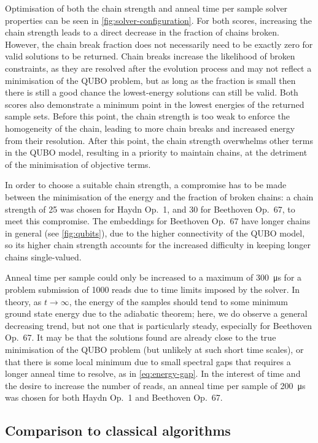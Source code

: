 \documentclass[twocolumn]{article}
\theoremstyle{definition}
\begin{document}
Optimisation of both the chain strength and anneal time per sample solver properties can be seen in \cref{fig:solver-configuration}. For both scores, increasing the chain strength leads to a direct decrease in the fraction of chains broken. However, the chain break fraction does not necessarily need to be exactly zero for valid solutions to be returned. Chain breaks increase the likelihood of broken constraints, as they are resolved after the evolution process and may not reflect a minimisation of the QUBO problem, but as long as the fraction is small then there is still a good chance the lowest-energy solutions can still be valid. Both scores also demonstrate a minimum point in the lowest energies of the returned sample sets. Before this point, the chain strength is too weak to enforce the homogeneity of the chain, leading to more chain breaks and increased energy from their resolution. After this point, the chain strength overwhelms other terms in the QUBO model, resulting in a priority to maintain chains, at the detriment of the minimisation of objective terms.

In order to choose a suitable chain strength, a compromise has to be made between the minimisation of the energy and the fraction of broken chains: a chain strength of \num{25} was chosen for Haydn Op.\ 1, and \num{30} for Beethoven Op.\ 67, to meet this compromise. The embeddings for Beethoven Op.\ 67 have longer chains in general (see \cref{fig:qubits}), due to the higher connectivity of the QUBO model, so its higher chain strength accounts for the increased difficulty in keeping longer chains single-valued.

Anneal time per sample could only be increased to a maximum of \qty{300}{\us} for a problem submission of \num{1000} reads due to time limits imposed by the solver. In theory, as $t\to\infty$, the energy of the samples should tend to some minimum ground state energy due to the adiabatic theorem; here, we do observe a general decreasing trend, but not one that is particularly steady, especially for Beethoven Op.\ 67. It may be that the solutions found are already close to the true minimisation of the QUBO problem (but unlikely at such short time scales), or that there is some local minimum due to small spectral gaps that requires a longer anneal time to resolve, as in \cref{eq:energy-gap}. In the interest of time and the desire to increase the number of reads, an anneal time per sample of \qty{200}{\us} was chosen for both Haydn Op.\ 1 and Beethoven Op.\ 67.

\subsection*{Comparison to classical algorithms}
\end{document}
